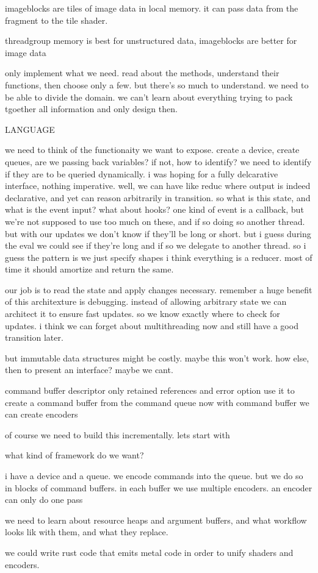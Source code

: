imageblocks are tiles of image data in local memory. 
it can pass data from the fragment to the tile shader.

threadgroup memory is best for unstructured data, imageblocks are better for image data

only implement what we need.
read about the methods, understand their functions, then choose only a few. 
but there's so much to understand. we need to be able to divide the domain. we can't learn about everything trying to pack tgoether all information and only design then. 





LANGUAGE

we need to think of the functionaity we want to expose. 
create a device, create queues, 
are we passing back variables? if not, how to identify? we need to identify if they are to be queried dynamically. 
i was hoping for a fully delcarative interface, nothing imperative. well, we can have like reduc where output is indeed declarative, and yet can reason arbitrarily in transition. 
so what is this state, and what is the event input? 
what about hooks? 
one kind of event is a callback, but we're not supposed to use too much on these, and if so doing so another thread. but with our updates we don't know if they'll be long or short. but i guess during the eval we could see if they're long and if so we delegate to another thread.
so i guess the pattern is we just specify shapes 
i think everything is a reducer. most of time it should amortize and return the same. 

our job is to read the state and apply changes necessary.
remember a huge benefit of this architexture is debugging. 
instead of allowing arbitrary state we can architect it to ensure fast updates. so we know exactly where to check for updates. 
i think we can forget about multithreading now and still have a good transition later. 

but immutable data structures might be costly. maybe this won't work. how else, then to present an interface? maybe we cant. 


command buffer descriptor
    only retained references and error option
use it to create a command buffer from the command queue
now with command buffer we can create encoders


of course we need to build this incrementally. 
lets start with 

what kind of framework do we want?

i have a device and a queue.
we encode commands into the queue. but we do so in blocks of command buffers.
in each buffer we use multiple encoders. 
an encoder can only do one pass 

we need to learn about resource heaps and argument buffers, and what workflow looks lik with them, and what they replace.


we could write rust code that emits metal code in order to unify shaders and encoders.





